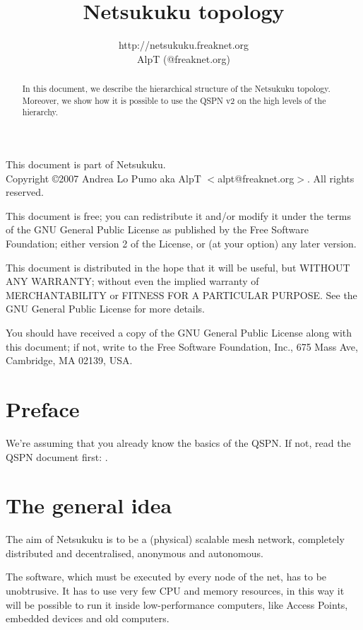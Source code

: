 \documentclass[a4paper]{article}
\title{Netsukuku topology}
\author{http://netsukuku.freaknet.org\\AlpT (@freaknet.org)}
\begin{document}
\maketitle
\begin{abstract}
	In this document, we describe the hierarchical structure of the Netsukuku
	topology. Moreover, we show how it is possible to use the QSPN v2 on
	the high levels of the hierarchy.
\end{abstract}
\pagebreak
\begin{small}
  This document is part of Netsukuku.\\
  Copyright \copyright 2007 Andrea Lo Pumo aka AlpT $<$alpt@freaknet.org$>$.
  All rights reserved.

  This document is free; you can redistribute it and/or modify it
  under the terms of the GNU General Public License as published by
  the Free Software Foundation; either version 2 of the License, or
  (at your option) any later version.

  This document is distributed in the hope that it will be useful, but
  WITHOUT ANY WARRANTY; without even the implied warranty of
  MERCHANTABILITY or FITNESS FOR A PARTICULAR PURPOSE\@.  See the GNU
  General Public License for more details.

  You should have received a copy of the GNU General Public License
  along with this document; if not, write to the Free Software
  Foundation, Inc., 675 Mass Ave, Cambridge, MA 02139, USA.
\end{small}

\clearpage
\tableofcontents
\clearpage
{}


\section{Preface}
\label{sec:preface}

We're assuming that you already know the basics of the QSPN. If not, read the
QSPN document first: \cite{qspndoc}.

\section{The general idea}
\label{sec:general_idea}

The aim of Netsukuku is to be a (physical) scalable mesh network, completely
distributed and decentralised, anonymous and autonomous.

The software, which must be executed by every node of the net, has to be
unobtrusive. It has to use very few CPU and memory resources, in this way it
will be possible to run it inside low-performance computers, like Access Points,
embedded devices and old computers.
\end{document}
